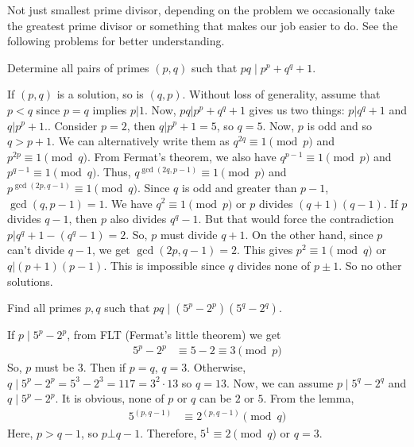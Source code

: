 \begin{note}
	Not just smallest prime divisor, depending on the problem we occasionally take the greatest prime divisor or something that makes our job easier to do. See the following problems for better understanding.
\end{note}

	\begin{problem}
		Determine all pairs of primes $(p,q)$ such that $pq\mid p^p+q^q+1$.
	\end{problem}

	\begin{solution}
		If $(p,q)$ is a solution, so is $(q,p)$. Without loss of generality, assume that $p<q$ since $p=q$ implies $p|1$. Now, $pq|p^p+q^q+1$ gives us two things: $p|q^q+1$ and $q|p^p+1$.. Consider $p=2$, then $q|p^p+1=5$, so $q=5$.
		Now, $p$ is odd and so $q>p+1$. We can alternatively write them as $q^{2q}\equiv1\pmod p$ and $p^{2p}\equiv1\pmod q$. From Fermat's theorem, we also have $q^{p-1}\equiv1\pmod p$ and $p^{q-1}\equiv1\pmod q$. Thus, $q^{\gcd(2q,p-1)}\equiv1\pmod p$ and $p^{\gcd(2p,q-1)}\equiv1\pmod q$. Since $q$ is odd and greater than $p-1$, $\gcd(q,p-1)=1$. We have $q^2\equiv1\pmod p$ or $p$ divides $(q+1)(q-1)$. If $p$ divides $q-1$, then $p$ also divides $q^q-1$. But that would force the contradiction $p|q^q+1-(q^q-1)=2$. So, $p$ must divide $q+1$. On the other hand, since $p$ can't divide $q-1$, we get $\gcd(2p,q-1)=2$. This gives $p^2\equiv1\pmod q$ or $q|(p+1)(p-1)$. This is impossible since $q$ divides none of $p\pm1$. So no other solutions.
	\end{solution}

	\begin{problem}
		Find all primes $p,q$ such that $pq\mid (5^p-2^p)(5^q-2^q)$.
	\end{problem}

	\begin{solution}
		If  $p\mid 5^p-2^p$, from FLT (Fermat's little theorem) we get
		\begin{align*}
			5^p-2^p &\equiv5-2\equiv3\pmod p
		\end{align*}
		So, $p$ must be $3$. Then if $p=q$, $q=3$. Otherwise, $q\mid 5^p-2^p=5^3-2^3=117=3^2\cdot13$ so $q=13$.  Now, we can assume $p\mid 5^q-2^q$ and $q\mid 5^p-2^p$. It is obvious, none of $p$ or $q$ can be $2$ or $5$. From the lemma,
		\begin{align*}
			5^{(p,q-1)}&\equiv2^{(p,q-1)}\pmod q
		\end{align*}
		Here, $p>q-1$, so $p\bot q-1$. Therefore, $5^1\equiv2\pmod q$ or $q=3$.
	\end{solution}
